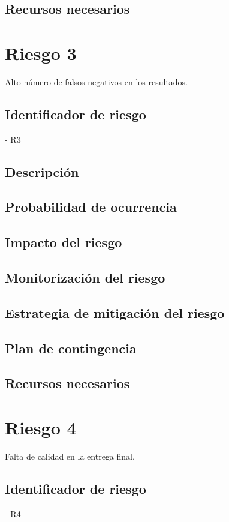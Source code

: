 \subsection{Recursos necesarios}

\section{Riesgo 3}

Alto número de falsos negativos en los resultados.

\subsection{Identificador de riesgo}
- R3
\subsection{Descripción}
\subsection{Probabilidad de ocurrencia}
\subsection{Impacto del riesgo}
\subsection{Monitorización del riesgo}
\subsection{Estrategia de mitigación del riesgo}
\subsection{Plan de contingencia}
\subsection{Recursos necesarios}

\section{Riesgo 4}

Falta de calidad en la entrega final.

\subsection{Identificador de riesgo}
- R4
